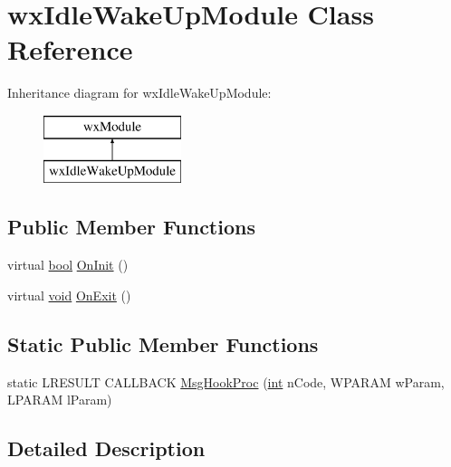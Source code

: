 \hypertarget{classwx_idle_wake_up_module}{}\section{wx\+Idle\+Wake\+Up\+Module Class Reference}
\label{classwx_idle_wake_up_module}
Inheritance diagram for wx\+Idle\+Wake\+Up\+Module\+:\begin{figure}[H]
\begin{center}
\leavevmode
\includegraphics[height=2.000000cm]{classwx_idle_wake_up_module}
\end{center}
\end{figure}
\subsection*{Public Member Functions}
\begin{DoxyCompactItemize}
\item 
virtual \hyperlink{mac_2config_2i386_2lib-src_2libsoxr_2soxr-config_8h_abb452686968e48b67397da5f97445f5b}{bool} \hyperlink{classwx_idle_wake_up_module_a415af0cc057fe8ef6314e67166d016a8}{On\+Init} ()
\item 
virtual \hyperlink{sound_8c_ae35f5844602719cf66324f4de2a658b3}{void} \hyperlink{classwx_idle_wake_up_module_a9c8e969d6bd2728b20a1a52bd7074b3d}{On\+Exit} ()
\end{DoxyCompactItemize}
\subsection*{Static Public Member Functions}
\begin{DoxyCompactItemize}
\item 
static L\+R\+E\+S\+U\+LT C\+A\+L\+L\+B\+A\+CK \hyperlink{classwx_idle_wake_up_module_a217aefb6cc5cdb91521f5c2246ba43e5}{Msg\+Hook\+Proc} (\hyperlink{xmltok_8h_a5a0d4a5641ce434f1d23533f2b2e6653}{int} n\+Code, W\+P\+A\+R\+AM w\+Param, L\+P\+A\+R\+AM l\+Param)
\end{DoxyCompactItemize}


\subsection{Detailed Description}


